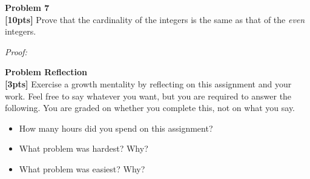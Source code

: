 \documentclass{article}
\newenvironment{problem}[2][Problem]
    { \begin{mdframed}[backgroundcolor=gray!20] \textbf{#1 #2} \\}
    {  \end{mdframed}}
\newenvironment{solution}
    {\textit{Proof:}}
    {}
\begin{document}
\begin{problem}{7}
\textbf{[10pts]} Prove that the cardinality of the integers is the same as that of the \textit{even} integers.
\end{problem}
\begin{solution}
\end{solution}

\begin{problem}{Reflection}
\textbf{[3pts]} Exercise a growth mentality by reflecting on this assignment and your work. Feel free to say whatever you want, but you are required to answer the following. You are graded on whether you complete this, not on what you say.
\begin{itemize}
\item How many hours did you spend on this assignment?
\item What problem was hardest? Why?
\item What problem was easiest? Why?
\end{itemize}
\end{problem}
\end{document}
